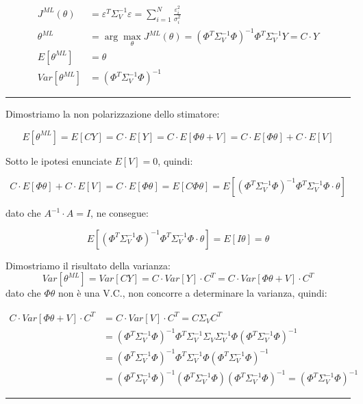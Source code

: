   \begin{align*}
    J^{ML}(\theta)&=\varepsilon ^T \Sigma_V^{-1}\varepsilon = \sum_{i=1}^{N}{\frac{\varepsilon_i^2}{\sigma_i^2} }\\
    \theta^{ML}&= \arg \max_{\theta} J^{ML}(\theta)=(\Phi^T\Sigma_V^{-1}\Phi)^{-1}\Phi^T\Sigma_V^{-1}Y=C \cdot Y\\
    E[{\theta^{ML}}]&=\theta \\
    Var[\theta^{ML}]&=(\Phi^T\Sigma_V^{-1}\Phi)^{-1}
  \end{align*}
  
\begin{center} \rule{300pt}{1pt} \end{center}
\begin{dimostrazione} %
Dimostriamo la non polarizzazione dello stimatore:

  \[ E[\theta^{ML}]=E[CY]=C\cdot E[Y]=C\cdot E[\Phi\theta+V]=C\cdot E[\Phi\theta]+C\cdot E[V] \]
  
Sotto le ipotesi enunciate $E[V]=0$, quindi:

  \[ C\cdot E[\Phi\theta]+C\cdot E[V]=C\cdot E[\Phi\theta]=E[C\Phi\theta]=E\left[(\Phi^T\Sigma_V^{-1}\Phi)^{-1}\Phi^T\Sigma_V^{-1}\Phi\cdot\theta \right] \]
  
dato che $A^{-1}\cdot A=I$, ne consegue:

  \[ E\left[(\Phi^T\Sigma_V^{-1}\Phi)^{-1}\Phi^T\Sigma_V^{-1}\Phi\cdot\theta \right]=E[I\theta]=\theta \]
\end{dimostrazione}
\begin{dimostrazione} %
Dimostriamo il risultato della varianza:
  \[ Var[\theta^{ML}]=Var[CY]=C\cdot Var[Y]\cdot C^T = C\cdot Var[\Phi\theta+V]\cdot C^T \]
dato che $\Phi\theta$ non è una V.C., non concorre a determinare la varianza, quindi:

  \[ 
  \begin{split}
      C\cdot Var[\Phi\theta+V]\cdot C^T&=C\cdot Var[V]\cdot C^T=C\Sigma_VC^T\\
      &=(\Phi^T\Sigma_V^{-1}\Phi)^{-1}\Phi^T\Sigma_V^{-1}\Sigma_V \Sigma_V^{-1} \Phi(\Phi^T\Sigma_V^{-1}\Phi)^{-1}\\
      &=(\Phi^T\Sigma_V^{-1}\Phi)^{-1}\Phi^T \Sigma_V^{-1} \Phi(\Phi^T\Sigma_V^{-1}\Phi)^{-1}\\
      &=(\Phi^T\Sigma_V^{-1}\Phi)^{-1}(\Phi^T \Sigma_V^{-1} \Phi)(\Phi^T\Sigma_V^{-1}\Phi)^{-1}=(\Phi^T\Sigma_V^{-1}\Phi)^{-1}
  \end{split} 
  \]
\end{dimostrazione}
\begin{center} \rule{300pt}{1pt} \end{center}

